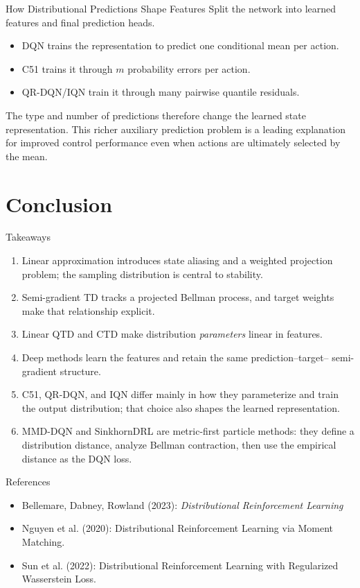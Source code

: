 \documentclass[10pt]{beamer}
\newcommand{\1}{\mathds{1}}
\begin{document}
\begin{frame}{How Distributional Predictions Shape Features}
  Split the network into learned features and final prediction heads.
  \begin{itemize}
    \item DQN trains the representation to predict one conditional mean per action.
    \item C51 trains it through $m$ probability errors per action.
    \item QR-DQN/IQN train it through many pairwise quantile residuals.
  \end{itemize}
  The type and number of predictions therefore change the learned state
  representation. This richer auxiliary prediction problem is a leading
  explanation for improved control performance even when actions are ultimately
  selected by the mean.
\end{frame}

\section{Conclusion}

\begin{frame}{Takeaways}
  \begin{enumerate}
    \item Linear approximation introduces state aliasing and a weighted projection
      problem; the sampling distribution is central to stability.
    \item Semi-gradient TD tracks a projected Bellman process, and target weights
      make that relationship explicit.
    \item Linear QTD and CTD make distribution \emph{parameters} linear in features.
    \item Deep methods learn the features and retain the same prediction--target--
      semi-gradient structure.
    \item C51, QR-DQN, and IQN differ mainly in how they parameterize and train the
      output distribution; that choice also shapes the learned representation.
    \item MMD-DQN and SinkhornDRL are metric-first particle methods: they define
      a distribution distance, analyze Bellman contraction, then use the
      empirical distance as the DQN loss.
  \end{enumerate}
\end{frame}

\fi

\begin{frame}{References}
  \footnotesize
  \begin{itemize}
    \item Bellemare, Dabney, Rowland (2023): \emph{Distributional Reinforcement Learning}
    \item Nguyen et al. (2020): Distributional Reinforcement Learning via Moment Matching.
    \item Sun et al. (2022): Distributional Reinforcement Learning with Regularized Wasserstein Loss.
  \end{itemize}
\end{frame}
\end{document}
